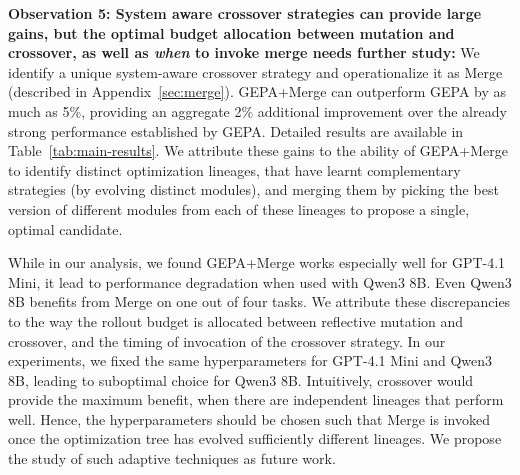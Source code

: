 \documentclass{article} %
\begin{document}
\textbf{Observation 5: System aware crossover strategies can provide large gains, but the optimal budget allocation between mutation and crossover, as well as \textit{when} to invoke merge needs further study:} We identify a unique system-aware crossover strategy and operationalize it as Merge (described in Appendix~\ref{sec:merge}). GEPA+Merge can outperform GEPA by as much as 5\%, providing an aggregate 2\% additional improvement over the already strong performance established by GEPA. Detailed results are available in Table~\ref{tab:main-results}. We attribute these gains to the ability of GEPA+Merge to identify distinct optimization lineages, that have learnt complementary strategies (by evolving distinct modules), and merging them by picking the best version of different modules from each of these lineages to propose a single, optimal candidate.

While in our analysis, we found GEPA+Merge works especially well for GPT-4.1 Mini, it lead to performance degradation when used with Qwen3 8B. Even Qwen3 8B benefits from Merge on one out of four tasks. We attribute these discrepancies to the way the rollout budget is allocated between reflective mutation and crossover, and the timing of invocation of the crossover strategy. In our experiments, we fixed the same hyperparameters for GPT-4.1 Mini and Qwen3 8B, leading to suboptimal choice for Qwen3 8B. Intuitively, crossover would provide the maximum benefit, when there are independent lineages that perform well. Hence, the hyperparameters should be chosen such that Merge is invoked once the optimization tree has evolved sufficiently different lineages. We propose the study of such adaptive techniques as future work.



\end{document}
